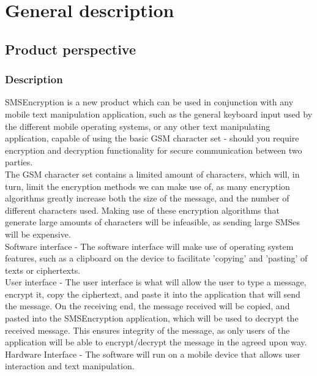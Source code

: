 \section{General description}

\subsection{Product perspective}

\subsubsection{Description}
SMSEncryption is a new product which can be used in conjunction with any mobile text manipulation application, such as the general keyboard input used by the different mobile operating systems, or any other text manipulating application, capable of using the basic GSM character set - should you require encryption and decryption functionality for secure communication between two parties.
\vspace{12pt}\\
The GSM character set contains a limited amount of characters, which will, in turn, limit the encryption methods we can make use of, as many encryption algorithms greatly increase both the size of the message, and the number of different characters used. Making use of these encryption algorithms that generate large amounts of characters will be infeasible, as sending large SMSes will be expensive.
\vspace{12pt}\\
Software interface - The software interface will make use of operating system features, such as a clipboard on the device to facilitate 'copying' and 'pasting' of texts or ciphertexts.
\vspace{12pt}\\
User interface - The user interface is what will allow the user to type a message, encrypt it, copy the ciphertext, and paste it into the application that will send the message. On the receiving end, the message received will be copied, and pasted into the SMSEncryption application, which will be used to decrypt the received message. This ensures integrity of the message, as only users of the application will be able to encrypt/decrypt the message in the agreed upon way.
\vspace{12pt}\\
Hardware Interface - The software will run on a mobile device that allows user interaction and text manipulation.


